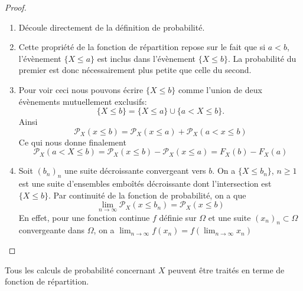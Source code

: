\documentclass[a4paper,12pt]{report}
\theoremstyle{definition}
\newcommand{\ra}{\rightarrow}
\renewcommand{\(}{\left(}
\renewcommand{\)}{\right)}
\renewcommand{\P}{\mathcal{P}}
\begin{document}
            \begin{proof}
                ${}$
                \begin{enumerate}[label=(\roman*)]
                    \item Découle directement de la définition de probabilité.
                    
                    \item Cette propriété de la fonction de répartition repose sur le fait que si $a<b$, l'évènement $\{X \le a\}$ est inclus dans l'évènement $\{X \le b\}$. La probabilité du premier est donc nécessairement plus petite que celle du second.
                    
                    \item Pour voir ceci nous pouvons écrire $\{ X \le b\}$ comme l'union de deux évènements mutuellement exclusifs:
                    $$\{ X \le b\} = \{ X \le a\} \cup \{a < X \le b\}.$$
                    Ainsi
                    $$\P_X(x\le b) = \P_X(x \le a) + \P_X (a < x\le b)$$
                    Ce qui nous donne finalement
                    $$\P_X(a < X \le b) = \P_X(x\le b) - \P_X( x \le a) = F_X(b)-F_X(a)$$
                    
                    \item Soit $(b_n)_n$ une suite décroissante convergeant vers $b$. On a $\{X \leq b_n\}$, $n \geq 1$ est une suite d'ensembles emboîtés décroissante dont l'intersection est $\{X \leq b\}$. Par continuité de la fonction de probabilité, on a que
                    $$\displaystyle{\lim_{n\ra \infty}\P_X(x \leq b_n) = \P_X(x \leq b)}$$
                    En effet, pour une fonction continue $f$ définie sur $\Omega$ et une suite $(x_n)_n \subset \Omega$ convergeante dans $\Omega$, on a $\displaystyle{\lim_{n\ra \infty}f(x_n) = f\left(\lim_{n\ra \infty}x_n\right)}$
                \end{enumerate}
            \end{proof}
            Tous les calculs de probabilité concernant $X$ peuvent être traités en terme de fonction de répartition.
            
\end{document}
